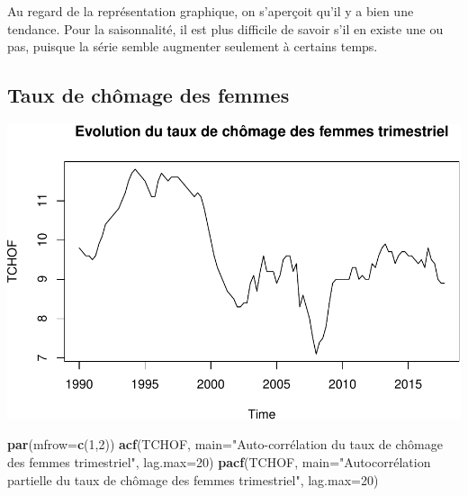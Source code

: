 \documentclass[11pt,]{article}
\newenvironment{Shaded}{\begin{snugshade}}{\end{snugshade}}
\newcommand{\KeywordTok}[1]{\textcolor[rgb]{0.13,0.29,0.53}{\textbf{{#1}}}}
\newcommand{\DataTypeTok}[1]{\textcolor[rgb]{0.13,0.29,0.53}{{#1}}}
\newcommand{\DecValTok}[1]{\textcolor[rgb]{0.00,0.00,0.81}{{#1}}}
\newcommand{\StringTok}[1]{\textcolor[rgb]{0.31,0.60,0.02}{{#1}}}
\newcommand{\NormalTok}[1]{{#1}}
\begin{document}
Au regard de la représentation graphique, on s'aperçoit qu'il y a bien
une tendance. Pour la saisonnalité, il est plus difficile de savoir s'il
en existe une ou pas, puisque la série semble augmenter seulement à
certains temps.

\subsection{Taux de chômage des
femmes}\label{taux-de-chomage-des-femmes}

\begin{Shaded}
\end{Shaded}

\includegraphics{doc_files/figure-latex/unnamed-chunk-5-1.pdf}

\begin{Shaded}
\begin{Highlighting}[]
  \KeywordTok{par}\NormalTok{(}\DataTypeTok{mfrow=}\KeywordTok{c}\NormalTok{(}\DecValTok{1}\NormalTok{,}\DecValTok{2}\NormalTok{))}
  \KeywordTok{acf}\NormalTok{(TCHOF, }\DataTypeTok{main=}\StringTok{"Auto-corrélation du taux de}
\StringTok{      chômage des femmes trimestriel"}\NormalTok{, }\DataTypeTok{lag.max=}\DecValTok{20}\NormalTok{)}
  \KeywordTok{pacf}\NormalTok{(TCHOF, }\DataTypeTok{main=}\StringTok{"Autocorrélation partielle du}
\StringTok{       taux de chômage des femmes trimestriel"}\NormalTok{, }\DataTypeTok{lag.max=}\DecValTok{20}\NormalTok{)}
\end{Highlighting}
\end{Shaded}
\end{document}
